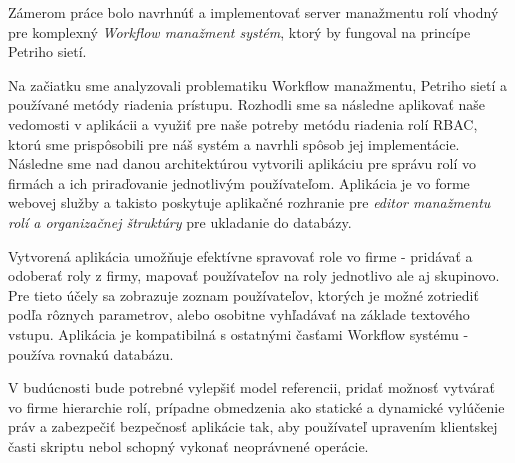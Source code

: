 Zámerom práce bolo navrhnúť a implementovať server manažmentu rolí vhodný pre komplexný \emph{Workflow manažment systém}, ktorý by fungoval na princípe Petriho sietí.

\noindent Na začiatku sme analyzovali problematiku Workflow manažmentu, Petriho sietí a používané metódy riadenia prístupu. Rozhodli sme sa následne aplikovať naše vedomosti v aplikácii a využiť pre naše potreby metódu riadenia rolí RBAC, ktorú sme prispôsobili pre náš systém a navrhli spôsob jej implementácie. Následne sme nad danou architektúrou vytvorili aplikáciu pre správu rolí vo firmách a ich  priraďovanie jednotlivým používateľom. Aplikácia je vo forme webovej služby a takisto poskytuje aplikačné rozhranie pre \emph{editor manažmentu rolí a organizačnej štruktúry} pre ukladanie do databázy.

\noindent Vytvorená aplikácia umožňuje efektívne spravovať role vo firme - pridávať a odoberať roly z firmy, mapovať používateľov na roly jednotlivo ale aj skupinovo. Pre tieto účely sa zobrazuje zoznam používateľov, ktorých je možné zotriediť podľa rôznych parametrov, alebo osobitne vyhľadávať na základe textového vstupu. Aplikácia je kompatibilná s ostatnými časťami Workflow systému - používa rovnakú databázu. 

\noindent V budúcnosti bude potrebné vylepšiť model referencii, pridať možnosť vytvárať vo firme hierarchie rolí, prípadne obmedzenia ako statické a dynamické vylúčenie práv  a zabezpečiť bezpečnosť aplikácie tak, aby používateľ upravením klientskej časti skriptu nebol schopný vykonať neoprávnené operácie. 


